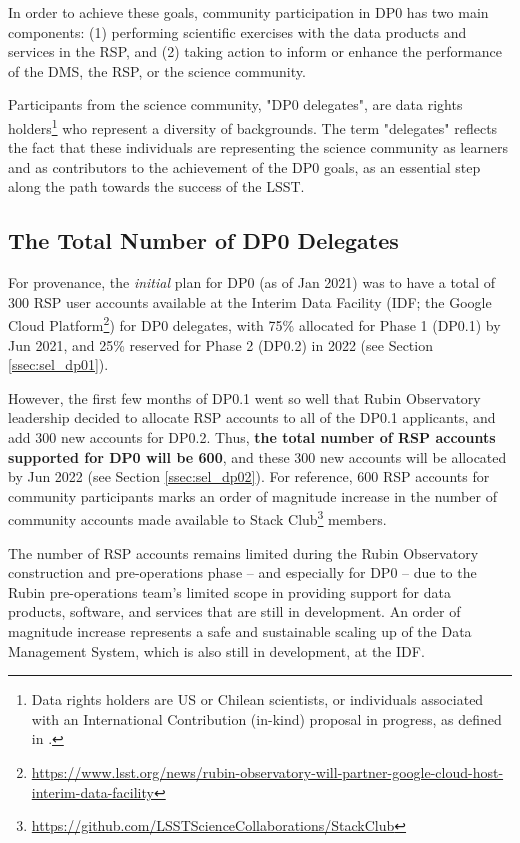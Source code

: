 \documentclass[DM,lsstdraft,authoryear,toc]{lsstdoc}
\begin{document}
In order to achieve these goals, community participation in DP0 has two main components:
(1) performing scientific exercises with the data products and services in the RSP, and
(2) taking action to inform or enhance the performance of the DMS, the RSP, or the science community.

Participants from the science community, "DP0 delegates", are data rights holders\footnote{Data rights holders are US or Chilean scientists, or individuals associated with an International Contribution (in-kind) proposal in progress, as defined in .} who represent a diversity of backgrounds.
The term "delegates" reflects the fact that these individuals are representing the science community as learners and as contributors to the achievement of the DP0 goals, as an essential step along the path towards the success of the LSST. 


\subsection{The Total Number of DP0 Delegates}

For provenance, the {\it initial} plan for DP0 (as of Jan 2021) was to have a total of 300 RSP user accounts available at the Interim Data Facility (IDF; the Google Cloud Platform\footnote{\url{https://www.lsst.org/news/rubin-observatory-will-partner-google-cloud-host-interim-data-facility}}) for DP0 delegates, with 75\% allocated for Phase 1 (DP0.1) by Jun 2021, and 25\% reserved for Phase 2 (DP0.2) in 2022 (see Section \ref{ssec:sel_dp01}).

However, the first few months of DP0.1 went so well that Rubin Observatory leadership decided to allocate RSP accounts to all of the DP0.1 applicants, and add 300 new accounts for DP0.2.
Thus, {\bf the total number of RSP accounts supported for DP0 will be 600}, and these 300 new accounts will be allocated by Jun 2022 (see Section \ref{ssec:sel_dp02}).
For reference, 600 RSP accounts for community participants marks an order of magnitude increase in the number of community accounts made available to Stack Club\footnote{\url{https://github.com/LSSTScienceCollaborations/StackClub}} members.

The number of RSP accounts remains limited during the Rubin Observatory construction and pre-operations phase -- and especially for DP0 -- due to the Rubin pre-operations team's limited scope in providing support for data products, software, and services that are still in development.
An order of magnitude increase represents a safe and sustainable scaling up of the Data Management System, which is also still in development, at the IDF.
\end{document}
